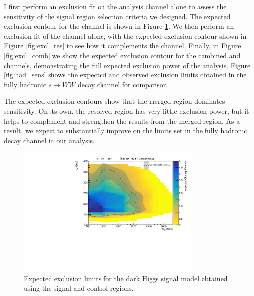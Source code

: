 I first perform an exclusion fit on the \merged analysis channel alone to assess the sensitivity of the \merged signal region selection criteria we designed. The expected exclusion contour for the \merged channel is shown in Figure \ref{fig:excl_mgd}. We then perform an exclusion fit of the \resolved channel alone, with the expected exclusion contour shown in Figure \ref{fig:excl_res} to see how it complements the \merged channel. Finally, in Figure \ref{fig:excl_comb} we show the expected exclusion contour for the combined \merged and \resolved channels, demonstrating the full expected exclusion power of the analysis. Figure \ref{fig:had_sens} shows the expected and observed exclusion limits obtained in the fully hadronic $s\rightarrow WW$ decay channel for comparison.

The expected exclusion contours show that the merged region dominates sensitivity. On its own, the resolved region has very little exclusion power, but it helps to complement and strengthen the results from the merged region. As a result, we expect to substantially improve on the limits set in the fully hadronic decay channel in our analysis.

\begin{figure}[h]
    \centering
    \includegraphics[width=0.8\textwidth]{Figures/5/fits/MERGED.pdf}
    \caption{Expected exclusion limits for the dark Higgs signal model obtained using the \merged signal and control regions.}
    \label{fig:excl_mgd}
\end{figure}

